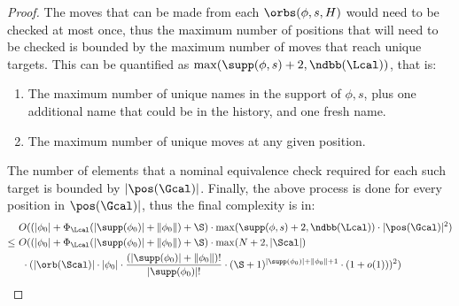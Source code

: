 \begin{proof}
	The moves that can be made from each $\orbs(\phi, s, H)$ would need to be checked at most once, thus the maximum number of positions that will need to be checked is bounded by the maximum number of moves that reach unique targets.
	This can be quantified as $\max(\supp(\phi, s) + 2, \ndbb(\Lcal))$, that is:
	\begin{enumerate}
		\item The maximum number of unique names in the support of $\phi, s$, plus one additional name that could be in the history, and one fresh name.
		\item The maximum number of unique moves at any given position.
	\end{enumerate}
	The number of elements that a nominal equivalence check required for each such target is bounded by $|\pos(\Gcal)|$.
	Finally, the above process is done for every position in $\pos(\Gcal)|$, 
	 thus the final complexity is in:
	\begin{align*}
 		&O(
 		(|\phi_0| + \Phi_\Lcal(|\supp(\phi_0)| + \|\phi_0\|) + \S) 			\cdot
 			\max(\supp(\phi, s) + 2, \ndbb(\Lcal)
 		)\cdot |\pos(\Gcal)|^2)
 		\\
 		\le\ &O(
 		(|\phi_0| + \Phi_\Lcal(|\supp(\phi_0)| + \|\phi_0\|) + \S)
 		\cdot
 		\max(N + 2, |\Scal|
 		) \\&\ \cdot 
 		(|\orb(\Scal)| \cdot|\phi_0|\cdot \frac{(|\supp(\phi_0)|+\|\phi_0\|)!}{|\supp(\phi_0)|!}\cdot (\S + 1)^{|\supp(\phi_0)| + \|\phi_0\| + 1}\cdot(1+o(1)))
 		^2)
 	\end{align*}
 \end{proof}

